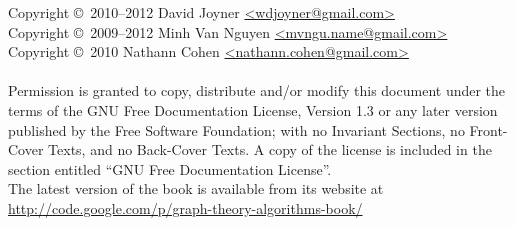 \noindent Copyright \copyright\ 2010--2012 David Joyner \url{<wdjoyner@gmail.com>} \\
Copyright \copyright\ 2009--2012 Minh Van Nguyen \url{<mvngu.name@gmail.com>} \\
Copyright \copyright\ 2010 Nathann Cohen \url{<nathann.cohen@gmail.com>} \\\\
Permission is granted to copy, distribute and/or modify this document
under the terms of the GNU Free Documentation License, Version 1.3
or any later version published by the Free Software Foundation;
with no Invariant Sections, no Front-Cover Texts, and no
Back-Cover Texts. A copy of the license is included in the section
entitled ``GNU Free Documentation License''. \\

\noindent
The latest version of the book is available from its website at \\

\url{http://code.google.com/p/graph-theory-algorithms-book/}
